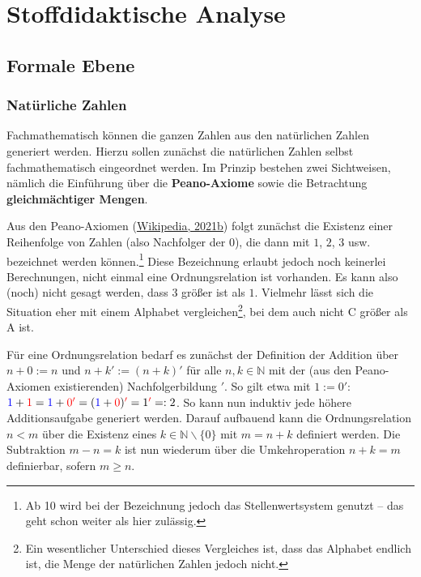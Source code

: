 \documentclass[
]{scrbook}
\theoremstyle{definition}
\theoremstyle{definition}
\theoremstyle{definition}
\theoremstyle{definition}
\theoremstyle{remark}
\begin{document}
\hypertarget{stoffdidaktische-analyse}{%
\section{Stoffdidaktische Analyse}\label{stoffdidaktische-analyse}}

\hypertarget{ganze-zahlen-formale-ebene}{%
\subsection{Formale Ebene}\label{ganze-zahlen-formale-ebene}}

\hypertarget{natuxfcrliche-zahlen-1}{%
\subsubsection{Natürliche Zahlen}\label{natuxfcrliche-zahlen-1}}

Fachmathematisch können die ganzen Zahlen aus den natürlichen Zahlen generiert werden. Hierzu sollen zunächst die natürlichen Zahlen selbst fachmathematisch eingeordnet werden. Im Prinzip bestehen zwei Sichtweisen, nämlich die Einführung über die \textbf{Peano-Axiome} sowie die Betrachtung \textbf{gleichmächtiger Mengen}.

Aus den Peano-Axiomen (\protect\hyperlink{ref-WikiPeano}{Wikipedia, 2021b}) folgt zunächst die Existenz einer Reihenfolge von Zahlen (also Nachfolger der \(0\)), die dann mit \(1\), \(2\), \(3\) usw. bezeichnet werden können.\footnote{Ab 10 wird bei der Bezeichnung jedoch das Stellenwertsystem genutzt -- das geht schon weiter als hier zulässig.} Diese Bezeichnung erlaubt jedoch noch keinerlei Berechnungen, nicht einmal eine Ordnungsrelation ist vorhanden. Es kann also (noch) nicht gesagt werden, dass \(3\) größer ist als \(1\). Vielmehr lässt sich die Situation eher mit einem Alphabet vergleichen\footnote{Ein wesentlicher Unterschied dieses Vergleiches ist, dass das Alphabet endlich ist, die Menge der natürlichen Zahlen jedoch nicht.}, bei dem auch nicht C größer als A ist.

Für eine Ordnungsrelation bedarf es zunächst der Definition der Addition über \(n+0 := n\) und \(n+k' := (n+k)'\) für alle \(n,k\in\mathbb{N}\) mit der (aus den Peano-Axiomen existierenden) Nachfolgerbildung \('\). So gilt etwa mit \(1:=0'\): \({\color{blue} 1}+{\color{red} 1} = {\color{blue} 1}+{\color{red} {0'}} = ({\color{blue} 1}+{\color{red} 0}){\color{red} '} = 1{\color{red} '} =: 2\). So kann nun induktiv jede höhere Additionsaufgabe generiert werden. Darauf aufbauend kann die Ordnungsrelation \(n<m\) über die Existenz eines \(k\in\mathbb{N}\backslash\{0\}\) mit \(m = n+k\) definiert werden. Die Subtraktion \(m-n = k\) ist nun wiederum über die Umkehroperation \(n+k = m\) definierbar, sofern \(m\geq n\).
\end{document}
